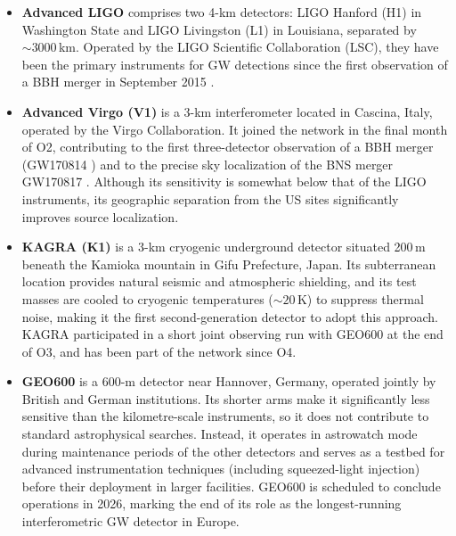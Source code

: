 \begin{itemize}

    \item \textbf{Advanced LIGO} \cite{Advanced_ligo} 
    comprises two 4-km detectors: LIGO Hanford (H1) in Washington State and LIGO Livingston (L1) in Louisiana, separated by $\sim\!3000$\,km. Operated by the LIGO Scientific Collaboration (LSC), they have been the primary instruments for GW detections 
    since the first observation of a BBH merger in September 2015 \cite{GW150914}.

    \item \textbf{Advanced Virgo (V1)} \cite{Advanced_VIRGO} is a 3-km interferometer located in Cascina, Italy, operated by the Virgo Collaboration. It joined the network in the final month of O2, contributing to the first three-detector observation of a BBH merger (GW170814 \cite{GW170814}) and to the precise sky localization of the BNS merger GW170817 \cite{GW170817}. Although its sensitivity is somewhat below that of the LIGO instruments, its geographic separation from the US sites significantly improves source localization.

    \item \textbf{KAGRA (K1)} \cite{KAGRA} is a 3-km cryogenic underground detector situated 200\,m beneath the Kamioka mountain in Gifu Prefecture, Japan. Its subterranean location provides natural seismic and atmospheric shielding, and its test masses are cooled to cryogenic temperatures ($\sim\!20$\,K) to suppress thermal noise, making it the first second-generation detector to adopt this approach. KAGRA participated in a short joint observing run with GEO600 at the end of O3, and has been part of the network since O4.

    \item \textbf{GEO600} \cite{GEO600} is a 600-m detector near Hannover, Germany, operated jointly by British and German institutions. Its shorter arms make it significantly less sensitive than the kilometre-scale instruments, so it does not contribute to standard astrophysical searches. Instead, it operates in astrowatch mode during maintenance periods of the other detectors and serves as a testbed for advanced instrumentation techniques (including squeezed-light injection) before their deployment in larger facilities. GEO600 is scheduled to conclude operations in 2026, marking the end of its role as the longest-running interferometric GW detector in Europe.

\end{itemize}


